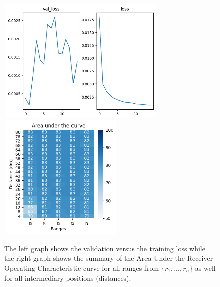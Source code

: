 \begin{multicols}{2}
\begin{itemize}
\end{itemize}
\end{multicols}\begin{figure}[H]%
\centering
\includegraphics[width=8cm,height=6cm]{3_models/models_30/graph_30.png}
\hspace{0.2 cm}
\includegraphics[width=6cm,height=6cm]{4_plots/plots_30/AUC_30.png}
\caption{The left graph shows the validation versus the training loss while the right graph shows the summary of the Area Under the Receiver Operating Characteristic curve for all ranges from $\{r_{1}, ... ,r_{n}\}$ as well for all intermediary positions (distances).}
\label{auc_30}
\end{figure}


\newpage
